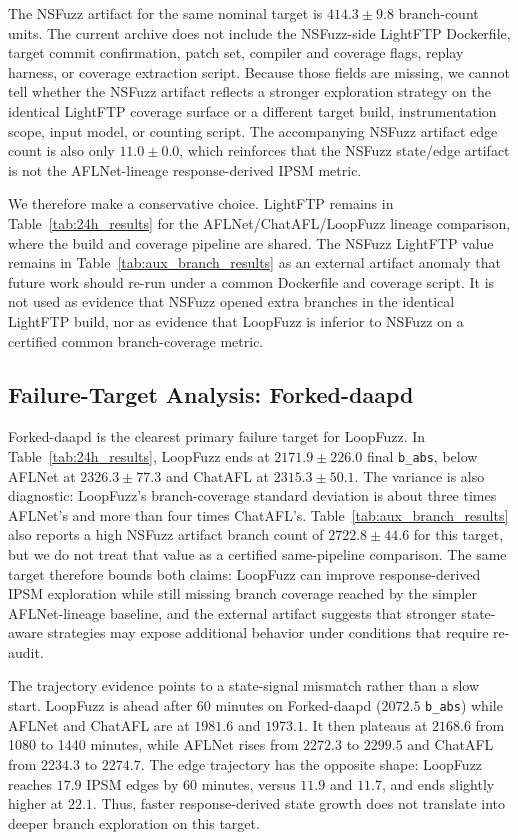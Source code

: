 \documentclass[final,5p,times,number]{elsarticle}
\begin{document}
The NSFuzz artifact for the same nominal target is $414.3{\pm}9.8$ branch-count units. The current archive does not include the NSFuzz-side LightFTP Dockerfile, target commit confirmation, patch set, compiler and coverage flags, replay harness, or coverage extraction script. Because those fields are missing, we cannot tell whether the NSFuzz artifact reflects a stronger exploration strategy on the identical LightFTP coverage surface or a different target build, instrumentation scope, input model, or counting script. The accompanying NSFuzz artifact edge count is also only $11.0{\pm}0.0$, which reinforces that the NSFuzz state/edge artifact is not the AFLNet-lineage response-derived IPSM metric.

We therefore make a conservative choice. LightFTP remains in Table~\ref{tab:24h_results} for the AFLNet/ChatAFL/LoopFuzz lineage comparison, where the build and coverage pipeline are shared. The NSFuzz LightFTP value remains in Table~\ref{tab:aux_branch_results} as an external artifact anomaly that future work should re-run under a common Dockerfile and coverage script. It is not used as evidence that NSFuzz opened extra branches in the identical LightFTP build, nor as evidence that LoopFuzz is inferior to NSFuzz on a certified common branch-coverage metric.

\subsection{Failure-Target Analysis: Forked-daapd}
\label{sec:forked_failure}

Forked-daapd is the clearest primary failure target for LoopFuzz. In Table~\ref{tab:24h_results}, LoopFuzz ends at $2171.9{\pm}226.0$ final \texttt{b\_abs}, below AFLNet at $2326.3{\pm}77.3$ and ChatAFL at $2315.3{\pm}50.1$. The variance is also diagnostic: LoopFuzz's branch-coverage standard deviation is about three times AFLNet's and more than four times ChatAFL's. Table~\ref{tab:aux_branch_results} also reports a high NSFuzz artifact branch count of $2722.8{\pm}44.6$ for this target, but we do not treat that value as a certified same-pipeline comparison. The same target therefore bounds both claims: LoopFuzz can improve response-derived IPSM exploration while still missing branch coverage reached by the simpler AFLNet-lineage baseline, and the external artifact suggests that stronger state-aware strategies may expose additional behavior under conditions that require re-audit.

The trajectory evidence points to a state-signal mismatch rather than a slow start. LoopFuzz is ahead after 60 minutes on Forked-daapd ($2072.5$ \texttt{b\_abs}) while AFLNet and ChatAFL are at $1981.6$ and $1973.1$. It then plateaus at $2168.6$ from 1080 to 1440 minutes, while AFLNet rises from $2272.3$ to $2299.5$ and ChatAFL from $2234.3$ to $2274.7$. The edge trajectory has the opposite shape: LoopFuzz reaches $17.9$ IPSM edges by 60 minutes, versus $11.9$ and $11.7$, and ends slightly higher at $22.1$. Thus, faster response-derived state growth does not translate into deeper branch exploration on this target.
\end{document}

